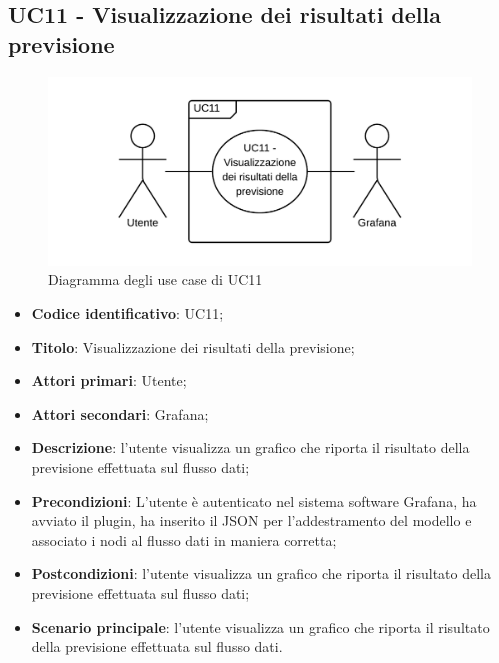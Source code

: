 \subsection{UC11 - Visualizzazione dei risultati della previsione}
\begin{figure}[H]
\includegraphics{img/UC11_-_Visualizzazione_dei_risultati_della_previsione.png}
\caption{Diagramma degli use case di UC11}
\end{figure}
\begin{itemize}
    \item \textbf{Codice identificativo}: UC11;
    \item \textbf{Titolo}: Visualizzazione dei risultati della previsione;
    \item \textbf{Attori primari}: Utente;
    \item \textbf{Attori secondari}: Grafana\glo;
    \item \textbf{Descrizione}: l'utente visualizza un grafico che riporta il risultato della previsione effettuata sul flusso dati;
    \item \textbf{Precondizioni}: L'utente è autenticato nel sistema software Grafana\glosp, ha avviato il plugin, ha inserito il JSON per l'addestramento del modello e associato i nodi al flusso dati in maniera corretta;
    \item \textbf{Postcondizioni}: l'utente visualizza un grafico che riporta il risultato della previsione effettuata sul flusso dati;
    \item \textbf{Scenario principale}: l'utente visualizza un grafico che riporta il risultato della previsione effettuata sul flusso dati.
\end{itemize}